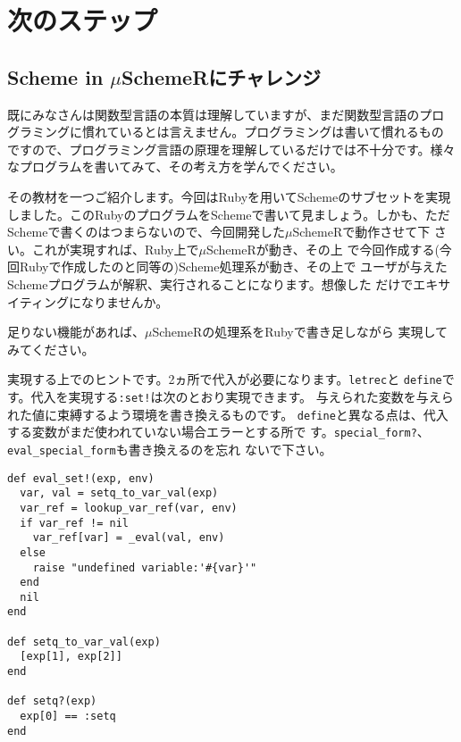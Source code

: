 \chapter{次のステップ\hspace{-3mm}}

\section{Scheme in $\mu$SchemeRにチャレンジ}
既にみなさんは関数型言語の本質は理解していますが、まだ関数型言語のプロ
グラミングに慣れているとは言えません。プログラミングは書いて慣れるもの
ですので、プログラミング言語の原理を理解しているだけでは不十分です。様々
なプログラムを書いてみて、その考え方を学んでください。

その教材を一つご紹介します。今回はRubyを用いてSchemeのサブセットを実現
しました。このRubyのプログラムをSchemeで書いて見ましょう。しかも、ただ
Schemeで書くのはつまらないので、今回開発した$\mu$SchemeRで動作させて下
さい。これが実現すれば、Ruby上で$\mu$SchemeRが動き、その上
で今回作成する(今回Rubyで作成したのと同等の)Scheme処理系が動き、その上で
ユーザが与えたSchemeプログラムが解釈、実行されることになります。想像した
だけでエキサイティングになりませんか。

足りない機能があれば、$\mu$SchemeRの処理系をRubyで書き足しながら
実現してみてください。

実現する上でのヒントです。2ヵ所で代入が必要になります。{\tt letrec}と
{\tt define}です。代入を実現する{\tt :set!}は次のとおり実現できます。
与えられた変数を与えられた値に束縛するよう環境を書き換えるものです。
{\tt define}と異なる点は、代入する変数がまだ使われていない場合エラーとする所で
す。{\tt special\_form?}、{\tt eval\_special\_form}も書き換えるのを忘れ
ないで下さい。

\label{list:setq}
\begin{lstlisting}
def eval_set!(exp, env)
  var, val = setq_to_var_val(exp)
  var_ref = lookup_var_ref(var, env)
  if var_ref != nil
    var_ref[var] = _eval(val, env)
  else
    raise "undefined variable:'#{var}'"    
  end
  nil
end

def setq_to_var_val(exp)
  [exp[1], exp[2]]
end

def setq?(exp)
  exp[0] == :setq
end
\end{lstlisting}



